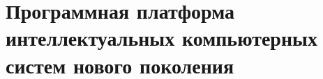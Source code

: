 \chapter{Программная платформа интеллектуальных компьютерных систем нового поколения}
\label{chapter_soft_platform}


%
